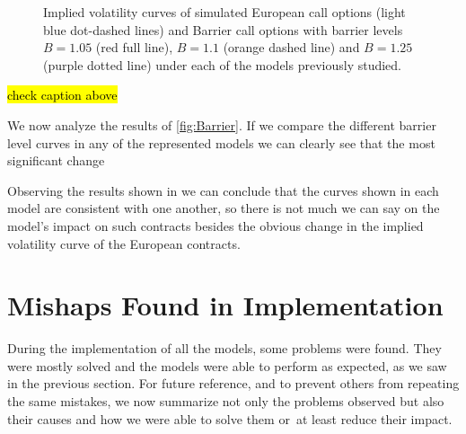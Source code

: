 \vspace{\fill}
\newpage

\begin{figure}[H]
  \begin{subfigmatrix}{2}
  \end{subfigmatrix}
    \caption[Implied volatility curves of simulated European call options and Barrier call options with barrier levels $B=1.05$, $B=1.1$ and $B=1.25$ under each of the models previously studied.]{Implied volatility curves of simulated European call options (light blue dot-dashed lines) and Barrier call options with barrier levels $B=1.05$ (red full line), $B=1.1$ (orange dashed line) and $B=1.25$ (purple dotted line) under each of the models previously studied.}\label{fig:Barrier}
\end{figure} 

\hl{check caption above}

We now analyze the results of \autoref{fig:Barrier}.
If we compare the different barrier level curves in any of the represented models we can clearly see that the most significant change 

Observing the results shown in  we can conclude that the curves shown in each model are consistent with one another, so there is not much we can say on the model's impact on such contracts besides the obvious change in the implied volatility curve of the European contracts.


\newpage

\section{Mishaps Found in Implementation}
During the implementation of all the models, some problems were found. They were mostly solved and the models were able to perform as expected, as we saw in the previous section. For future reference, and to prevent others from repeating the same mistakes, we now summarize not only the problems observed but also their causes and how we were able to solve them or~at least reduce their impact.

